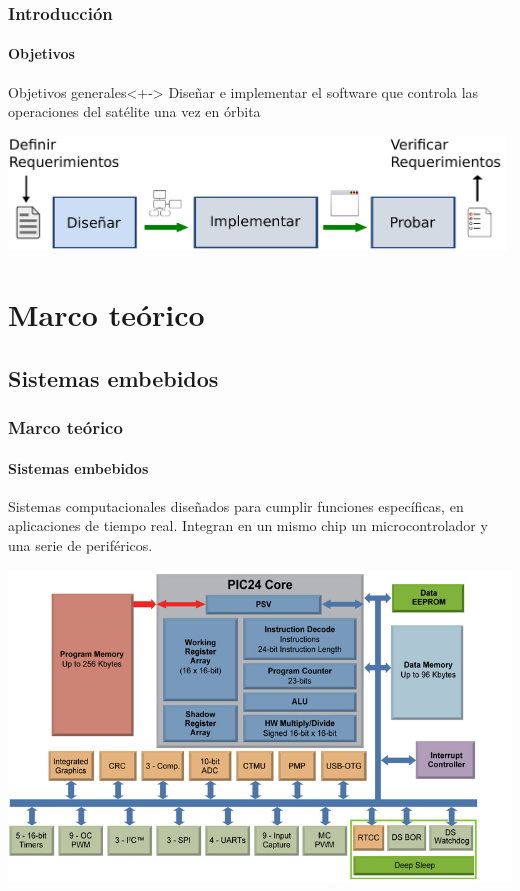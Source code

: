 \documentclass[xcolor=dvipsnames]{beamer}
\begin{document}
    \begin{frame}
        \frametitle{Introducción}
        \framesubtitle{Objetivos}
        
        \begin{block}{Objetivos generales}<+->
            Diseñar e implementar el software que controla las operaciones del satélite una vez en órbita
        \end{block}
        
        \vspace{1cm}
        
        \includegraphics[width=0.99\textwidth]{img/objetivos.pdf}
        
    \end{frame}
    
    \section{Marco teórico}
    \subsection{Sistemas embebidos}
    \begin{frame}
        \frametitle{Marco teórico}
        \framesubtitle{Sistemas embebidos}
        
            Sistemas computacionales diseñados para cumplir funciones específicas, en aplicaciones de tiempo real. 
            Integran en un mismo chip un microcontrolador y una serie de periféricos.
        
        \vspace{0.5cm}
        \centering
        \includegraphics[scale=0.33]{img/pic_perif.jpg}
        
    \end{frame}
    
\end{document}
